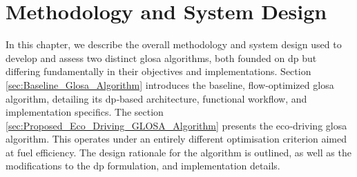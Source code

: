 \chapter{Methodology and System Design}
\label{ch:Methodology_System_Design}

In this chapter, we describe the overall methodology and system design used to develop and assess two distinct \ac{glosa} algorithms, both founded on \ac{dp} but differing fundamentally in their objectives and implementations. Section \ref{sec:Baseline_Glosa_Algorithm} introduces the baseline, flow‐optimized \ac{glosa} algorithm, detailing its \ac{dp}‐based architecture, functional workflow, and implementation specifics. The section \ref{sec:Proposed_Eco_Driving_GLOSA_Algorithm} presents the eco‐driving \ac{glosa} algorithm. This operates under an entirely different optimisation criterion aimed at fuel efficiency. The design rationale for the algorithm is outlined, as well as the modifications to the \ac{dp} formulation, and implementation details. 



